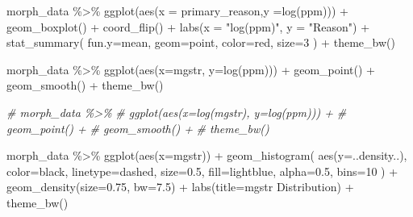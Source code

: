 \documentclass[
  11pt,
]{article}
\newenvironment{Shaded}{\begin{snugshade}}{\end{snugshade}}
\newcommand{\AttributeTok}[1]{\textcolor[rgb]{0.77,0.63,0.00}{#1}}
\newcommand{\CommentTok}[1]{\textcolor[rgb]{0.56,0.35,0.01}{\textit{#1}}}
\newcommand{\DecValTok}[1]{\textcolor[rgb]{0.00,0.00,0.81}{#1}}
\newcommand{\FloatTok}[1]{\textcolor[rgb]{0.00,0.00,0.81}{#1}}
\newcommand{\FunctionTok}[1]{\textcolor[rgb]{0.00,0.00,0.00}{#1}}
\newcommand{\NormalTok}[1]{#1}
\newcommand{\SpecialCharTok}[1]{\textcolor[rgb]{0.00,0.00,0.00}{#1}}
\newcommand{\StringTok}[1]{\textcolor[rgb]{0.31,0.60,0.02}{#1}}
\begin{document}
\begin{Shaded}
\begin{Highlighting}[]
\NormalTok{morph\_data }\SpecialCharTok{\%\textgreater{}\%}
  \FunctionTok{ggplot}\NormalTok{(}\FunctionTok{aes}\NormalTok{(}\AttributeTok{x =}\NormalTok{ primary\_reason,}\AttributeTok{y =}\FunctionTok{log}\NormalTok{(ppm))) }\SpecialCharTok{+}
  \FunctionTok{geom\_boxplot}\NormalTok{() }\SpecialCharTok{+}
  \FunctionTok{coord\_flip}\NormalTok{() }\SpecialCharTok{+}
  \FunctionTok{labs}\NormalTok{(}\AttributeTok{x =} \StringTok{"log(ppm)"}\NormalTok{, }\AttributeTok{y =} \StringTok{"Reason"}\NormalTok{)  }\SpecialCharTok{+}
    \FunctionTok{stat\_summary}\NormalTok{(}
      \AttributeTok{fun.y=}\NormalTok{mean,}
      \AttributeTok{geom=}\StringTok{\textquotesingle{}point\textquotesingle{}}\NormalTok{,}
      \AttributeTok{color=}\StringTok{\textquotesingle{}red\textquotesingle{}}\NormalTok{,}
      \AttributeTok{size=}\DecValTok{3}
\NormalTok{    ) }\SpecialCharTok{+}
  \FunctionTok{theme\_bw}\NormalTok{()}
\end{Highlighting}
\end{Shaded}

\begin{Shaded}
\begin{Highlighting}[]
\NormalTok{morph\_data }\SpecialCharTok{\%\textgreater{}\%}
  \FunctionTok{ggplot}\NormalTok{(}\FunctionTok{aes}\NormalTok{(}\AttributeTok{x=}\NormalTok{mgstr, }\AttributeTok{y=}\FunctionTok{log}\NormalTok{(ppm))) }\SpecialCharTok{+}
    \FunctionTok{geom\_point}\NormalTok{() }\SpecialCharTok{+}
    \FunctionTok{geom\_smooth}\NormalTok{() }\SpecialCharTok{+}
    \FunctionTok{theme\_bw}\NormalTok{()}

\CommentTok{\# morph\_data \%\textgreater{}\%}
\CommentTok{\#   ggplot(aes(x=log(mgstr), y=log(ppm))) +}
\CommentTok{\#     geom\_point() +}
\CommentTok{\#     geom\_smooth() +}
\CommentTok{\#     theme\_bw()}

\NormalTok{morph\_data }\SpecialCharTok{\%\textgreater{}\%}
  \FunctionTok{ggplot}\NormalTok{(}\FunctionTok{aes}\NormalTok{(}\AttributeTok{x=}\NormalTok{mgstr)) }\SpecialCharTok{+}
    \FunctionTok{geom\_histogram}\NormalTok{(}
      \FunctionTok{aes}\NormalTok{(}\AttributeTok{y=}\NormalTok{..density..),}
      \AttributeTok{color=}\StringTok{\textquotesingle{}black\textquotesingle{}}\NormalTok{,}
      \AttributeTok{linetype=}\StringTok{\textquotesingle{}dashed\textquotesingle{}}\NormalTok{,}
      \AttributeTok{size=}\FloatTok{0.5}\NormalTok{,}
      \AttributeTok{fill=}\StringTok{\textquotesingle{}lightblue\textquotesingle{}}\NormalTok{,}
      \AttributeTok{alpha=}\FloatTok{0.5}\NormalTok{,}
      \AttributeTok{bins=}\DecValTok{10}
\NormalTok{    ) }\SpecialCharTok{+}
    \FunctionTok{geom\_density}\NormalTok{(}\AttributeTok{size=}\FloatTok{0.75}\NormalTok{, }\AttributeTok{bw=}\FloatTok{7.5}\NormalTok{) }\SpecialCharTok{+}
    \FunctionTok{labs}\NormalTok{(}\AttributeTok{title=}\StringTok{\textquotesingle{}mgstr Distribution\textquotesingle{}}\NormalTok{) }\SpecialCharTok{+}
    \FunctionTok{theme\_bw}\NormalTok{()}
\end{Highlighting}
\end{Shaded}
\end{document}
